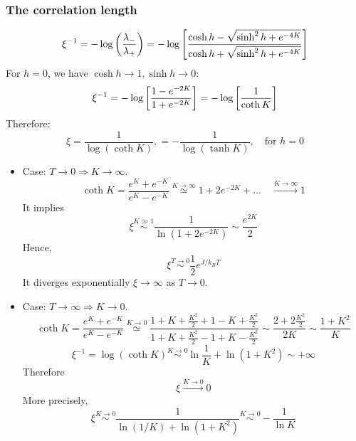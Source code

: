 \documentclass[../../Main/Main.tex]{subfiles}
\begin{document}
\subsubsection{The correlation length}
\begin{equation}
  \xi ^{-1} = -\log{\qty(\frac{\lambda _-}{\lambda _+}) } = - \log{\qty[ \frac{\cosh h - \sqrt{\sinh^2 h + e^{-4K} } }{\cosh h + \sqrt{\sinh^2 h + e^{-4K} }}] }
\end{equation}
For \( h=0 \), we have \( \cosh h \rightarrow 1, \sinh h \rightarrow 0 \):
\begin{equation*}
  \xi ^{-1} = - \log{\qty[\frac{1- e^{-2K} }{1+ e^{-2K} }] } =  - \log{\qty[\frac{1 }{\coth K }] }
\end{equation*}
Therefore:
\begin{equation}
  \xi = \frac{1}{\log{ (\coth K )} }, = -\frac{1}{\log{ (\tanh K )} }, \quad \text{for } h = 0
\end{equation}
\begin{itemize}
\item Case: \( T \rightarrow 0 \Rightarrow K \rightarrow \infty  \).
\begin{equation*}
  \coth K = \frac{e^{K} + e^{-K}  }{e^{K} - e^{-K}  } \overset{K \rightarrow \infty }{\simeq} 1 + 2 e^{-2K} + \dots \quad \overset{K \rightarrow \infty }{ \longrightarrow  } 1
\end{equation*}
It implies
\begin{equation*}
  \xi \overset{K \gg 1}{\sim } \frac{1}{\ln{(1+ 2 e^{-2K} )} } \sim \frac{e^{2K} }{2}
\end{equation*}
Hence,
\begin{equation}
  \xi \overset{T \rightarrow 0}{\sim } \frac{1}{2} e^{J/k_B T}
\end{equation}
It diverges exponentially \( \xi  \rightarrow \infty  \) as \( T \rightarrow 0 \).
\item Case: \( T \rightarrow \infty \Rightarrow K \rightarrow 0 \).
\begin{equation*}
  \coth K = \frac{e^{K} + e^{-K}  }{e^{K} - e^{-K}  } \overset{K \rightarrow 0 }{\simeq}
  \frac{1+K+\frac{K^2}{2}+1-K+\frac{K^2}{2}}{1+K+\frac{K^2}{2}-1+K-\frac{K^2}{2}}
  \sim \frac{2+2 \frac{K^2}{2}}{2K} \sim \frac{1+K^2}{K}
\end{equation*}
\begin{equation*}
  \xi ^{-1} = \log{(\coth K)} \overset{K \rightarrow 0}{\sim } \ln{\frac{1}{K}} + \ln{(1+K^2)} \sim + \infty
\end{equation*}
Therefore
\begin{equation*}
  \xi  \overset{K \rightarrow 0}{\longrightarrow} 0
\end{equation*}
More precisely,
\begin{equation}
  \xi \overset{K \rightarrow 0}{\sim } \frac{1}{\ln{(1/K)} + \ln{(1+K^2)}  } \overset{K \rightarrow 0}{\sim } - \frac{1}{\ln{K} }
\end{equation}

\end{itemize}
\end{document}
